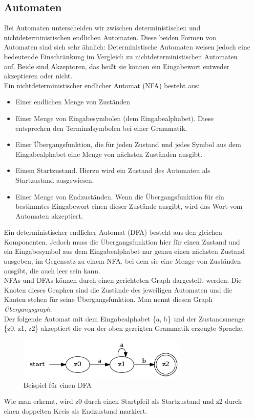 \subsection{Automaten}
\label{sec:1.2}
Bei Automaten unterscheiden wir zwischen deterministischen und nichtdeterministischen endlichen Automaten. Diese beiden Formen von Automaten sind sich sehr ähnlich: Deterministische Automaten weisen jedoch eine bedeutende Einschränkung im Vergleich zu nichtdeterministischen Automaten auf. Beide sind Akzeptoren, das heißt sie können ein Eingabewort entweder akzeptieren oder nicht.
\\
Ein nichtdeterministischer endlicher Automat (NFA) besteht aus:
\begin{itemize}
	\item Einer endlichen Menge von Zuständen
	\item Einer Menge von Eingabesymbolen (dem Eingabealphabet). Diese entsprechen den Terminalsymbolen bei einer Grammatik.
	\item Einer Übergangsfunktion, die für jeden Zustand und jedes Symbol aus dem Eingabealphabet eine Menge von nächsten Zuständen ausgibt.
	\item Einem Startzustand. Hierzu wird ein Zustand des Automaten als Startzustand ausgewiesen.
	\item Einer Menge von Endzuständen. Wenn die Übergangsfunktion für ein bestimmtes Eingabewort einen dieser Zustände ausgibt, wird das Wort vom Automaten akzeptiert.
\end{itemize}
Ein deterministischer endlicher Automat (DFA) besteht aus den gleichen Komponenten. Jedoch muss die Übergangsfunktion hier für einen Zustand und ein Eingabesymbol aus dem Eingabealphabet nur genau einen nächsten Zustand ausgeben, im Gegensatz zu einem NFA, bei dem sie eine Menge von Zuständen ausgibt, die auch leer sein kann.\\
NFAs und DFAs können durch einen gerichteten Graph dargestellt werden. Die Knoten dieses Graphen sind die Zustände des jeweiligen Automaten und die Kanten stehen für seine Übergangsfunktion. Man nennt diesen Graph \textit{Übergangsgraph}.\\
Der folgende Automat mit dem Eingabealphabet \{a, b\} und der Zustandsmenge \{z0, z1, z2\} akzeptiert die von der oben gezeigten Grammatik erzeugte Sprache.
\begin{figure}[H]
	\centering
	\includegraphics[width=0.75\textwidth]{bilder/beispiel_automat1.png}
	\caption{Beispiel für einen DFA}
	\label{fig:pic1}
\end{figure}
Wie man erkennt, wird z0 durch einen Startpfeil als Startzustand und z2 durch einen doppelten Kreis als Endzustand markiert.